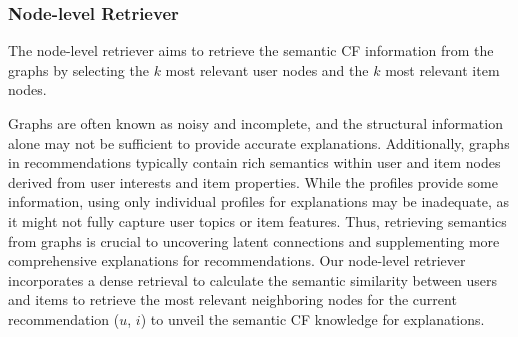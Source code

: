 
\subsubsection{Node-level Retriever}


The node-level retriever aims to retrieve the semantic CF information from the graphs by selecting the $k$ most relevant user nodes and the $k$ most relevant item nodes.

 Graphs are often known as noisy and incomplete, and the structural information alone may not be sufficient to provide accurate explanations. Additionally, graphs in recommendations typically contain rich semantics within user and item nodes derived from user interests and item properties. While the profiles provide some information, using only individual profiles for explanations may be inadequate, as it might not fully capture user topics or item features. Thus, retrieving semantics from graphs is crucial to uncovering latent connections and supplementing more comprehensive explanations for recommendations. Our node-level retriever incorporates a dense retrieval to calculate the semantic similarity between users and items to retrieve the most relevant neighboring nodes for the current recommendation ($u$, $i$) to unveil the semantic CF knowledge for explanations.


%

